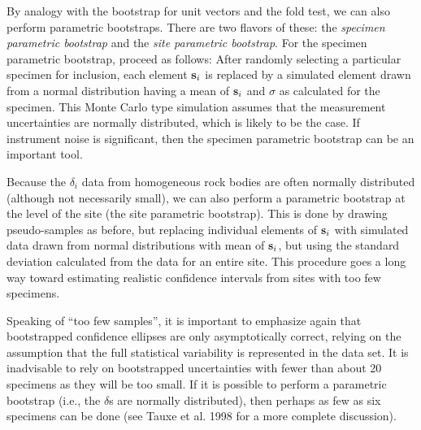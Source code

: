 By analogy with  the bootstrap for unit vectors and the 
fold test, we can also
perform  parametric bootstraps.  There are two flavors of these:  the {\it specimen parametric bootstrap} and the {\it site parametric bootstrap}.  For the specimen parametric bootstrap,  proceed as follows:
After randomly selecting
a particular specimen for inclusion, each element $\hbox{\bf s}_i$ is replaced by a
simulated element drawn from a normal distribution having a mean of $\hbox{\bf s}_i$ and 
$\sigma$ as calculated for the specimen.
This Monte Carlo type simulation  assumes
that the measurement uncertainties are normally distributed, which 
 is likely to be the case.  If instrument noise is significant, then
the specimen parametric bootstrap can be an important tool. 


Because the $\delta_i$ data from homogeneous rock bodies are often normally 
distributed (although not necessarily small), we can also perform a parametric bootstrap at the level of
the site (the {site parametric bootstrap}).  This is done by drawing pseudo-samples 
as before, but replacing individual elements of $\hbox{\bf s}_i$ with simulated data
drawn from normal distributions with mean of $\hbox{\bf s}_i$, but using the standard deviation 
calculated from the data for an entire site.  
This procedure goes a long way
toward estimating realistic confidence intervals from sites with too few
specimens.  

Speaking of ``too few samples'',  it is important to  emphasize again that bootstrapped confidence ellipses are only asymptotically correct, relying on the assumption that the full statistical variability is represented in the data set.  It is inadvisable to rely on bootstrapped uncertainties with fewer than about 20 specimens as they will be too small.  If it is possible to perform a parametric bootstrap (i.e., the $\delta$s are normally distributed), then perhaps as few as six specimens can be done (see 
Tauxe et al. 1998 for a more complete discussion).  \nocite{tauxe98b}     


